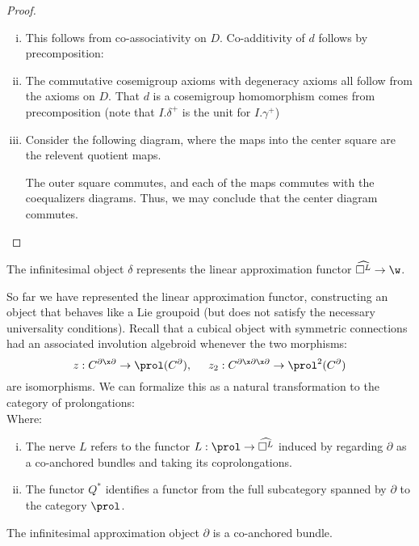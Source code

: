 \begin{proof}
~\begin{enumerate}[(i)]
    \item This follows from co-associativity on $D$. Co-additivity of $d$ follows by precomposition:
    
    \item The commutative cosemigroup axioms with degeneracy axioms all follow from the axioms on $D$. That $d$ is a cosemigroup homomorphism comes from precomposition (note that $I.\delta^+$ is the unit for $I.\gamma^+$)
    
    \item Consider the following diagram, where the maps into the center square are the relevent quotient maps.
    
    The outer square commutes, and each of the maps commutes with the coequalizers diagrams. Thus, we may conclude that the center diagram commutes.
\end{enumerate} 
\end{proof}
\begin{proposition}
    The infinitesimal object $\delta$ represents the linear approximation functor $\widehat{\square^L} \to \w$.
\end{proposition}

So far we have represented the linear approximation functor, constructing an object that behaves like a Lie groupoid (but does not satisfy the necessary universality conditions). 
Recall that a cubical object with symmetric connections had an associated involution algebroid whenever the two morphisms:
\[
    z: C^{\partial \x \partial} \to \prol(C^\partial), \hspace{0.5cm}
    z_2: C^{\partial\x\partial\x\partial} \to \prol^2(C^\partial)
\]
are isomorphisms. 
We can formalize this as a natural transformation to the category of prolongations:
\[\]
Where:
\begin{enumerate}[(i)]
    \item The nerve $L$ refers to the functor $L: \prol \to \widehat{\square^L}$ induced by regarding $\partial$ as a co-anchored bundles and taking its coprolongations.
    \item The functor $Q^*$ identifies a functor from the full subcategory spanned by $\partial$ to the category $\prol$.
\end{enumerate}
\begin{proposition}
    The infinitesimal approximation object $\partial$ is a co-anchored bundle.
\end{proposition}

